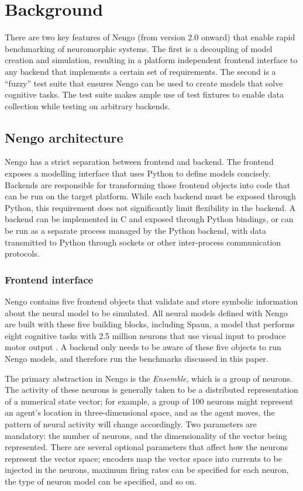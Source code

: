 \documentclass{frontiersSCNS}
\begin{document}
\section{Background}

There are two key features of Nengo
(from version 2.0 onward)
that enable rapid benchmarking of neuromorphic systems.
The first is a decoupling of model creation and simulation,
resulting in a platform independent frontend interface
to any backend that implements a certain set of requirements.
The second is a ``fuzzy'' test suite that ensures
Nengo can be used to create models that solve cognitive tasks.
The test suite makes ample use of test fixtures
to enable data collection while testing on arbitrary backends.

\subsection{Nengo architecture}

Nengo has a strict separation between
frontend and backend.
The frontend exposes a modelling interface
that uses Python to define models concisely.
Backends are responsible for transforming
those frontend objects into code that
can be run on the target platform.
While each backend must be exposed
through Python, this requirement
does not significantly limit
flexibility in the backend.
A backend can be implemented in C and exposed
through Python bindings,
or can be run as a separate process
managed by the Python backend,
with data transmitted to Python through sockets
or other inter-process communication protocols.

\subsubsection{Frontend interface}

Nengo contains five frontend objects
that validate and store symbolic information
about the neural model to be simulated.
All neural models defined with Nengo
are built with these five building blocks,
including Spaun, a model that performs
eight cognitive tasks with 2.5 million neurons
that use visual input to produce motor output
\citep{eliasmith2012}.
A backend only needs to be aware of these
five objects to run Nengo models,
and therefore run the benchmarks discussed in this paper.

The primary abstraction in Nengo is the \textit{Ensemble},
which is a group of neurons.
The activity of these neurons
is generally taken to be
a distributed representation
of a numerical state vector;
for example, a group of 100 neurons might represent
an agent's location in three-dimensional space,
and as the agent moves,
the pattern of neural activity
will change accordingly.
Two parameters are mandatory: the number of neurons,
and the dimensionality of the vector being represented.
There are several optional parameters that
affect how the neurons represent the vector space;
encoders map the vector space into currents
to be injected in the neurons,
maximum firing rates can be specified for each neuron,
the type of neuron model can be specified,
and so on.
\end{document}
